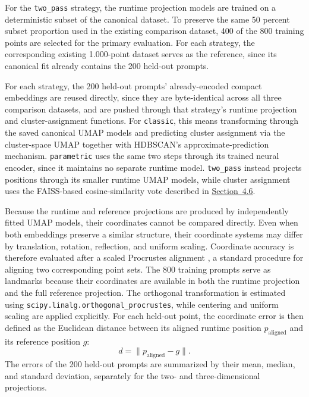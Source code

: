 For the \texttt{two\_pass} strategy, the runtime projection models are trained on a deterministic subset of the canonical dataset. To preserve the same 50 percent subset proportion used in the existing comparison dataset, 400 of the 800 training points are selected for the primary evaluation. For each strategy, the corresponding existing 1.000-point dataset serves as the reference, since its canonical fit already contains the 200 held-out prompts.

For each strategy, the 200 held-out prompts' already-encoded compact embeddings are reused directly, since they are byte-identical across all three comparison datasets, and are pushed through that strategy's runtime projection and cluster-assignment functions. For \texttt{classic}, this means transforming through the saved canonical UMAP models and predicting cluster assignment via the cluster-space UMAP together with HDBSCAN's approximate-prediction mechanism. \texttt{parametric} uses the same two steps through its trained neural encoder, since it maintains no separate runtime model. \texttt{two\_pass} instead projects positions through its smaller runtime UMAP models, while cluster assignment uses the FAISS-based cosine-similarity vote described in \hyperref[sec:4.6]{Section~4.6}.

Because the runtime and reference projections are produced by independently fitted UMAP models, their coordinates cannot be compared directly. Even when both embeddings preserve a similar structure, their coordinate systems may differ by translation, rotation, reflection, and uniform scaling. Coordinate accuracy is therefore evaluated after a scaled Procrustes alignment \cite{dupre2021procrustes}, a standard procedure for aligning two corresponding point sets. The 800 training prompts serve as landmarks because their coordinates are available in both the runtime projection and the full reference projection. The orthogonal transformation is estimated using \texttt{scipy.linalg.orthogonal\_procrustes}, while centering and uniform scaling are applied explicitly. For each held-out point, the coordinate error is then defined as the Euclidean distance between its aligned runtime position $p_{\text{aligned}}$ and its reference position $g$:
\[
d = \lVert p_{\text{aligned}} - g \rVert.
\]
The errors of the 200 held-out prompts are summarized by their mean, median, and standard deviation, separately for the two- and three-dimensional projections.

